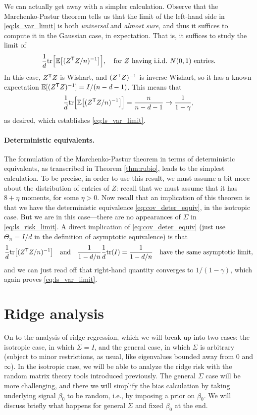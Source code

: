 \documentclass{article}
\begin{document}
We can actually get away with a simpler calculation. Observe that the
Marchenko-Pastur theorem tells us that the limit of the left-hand side in
\eqref{eq:ls_var_limit} is both \emph{universal} and \emph{almost sure}, and
thus it suffices to compute it in the Gaussian case, in expectation. That is, it 
suffices to study the limit of
\[
\frac{1}{d} \mathrm{tr} \Big[ \mathbb{E}\big[ (Z^{\mathsf{T}} Z/n)^{-1} \big] \Big], \quad \text{for $Z$ 
  having i.i.d.\ $N(0,1)$ entries.}
\]
In this case, $Z^{\mathsf{T}} Z$ is Wishart, and $(Z^{\mathsf{T}} Z)^{-1}$ is inverse Wishart, so it
has a known expectation $\mathbb{E}[(Z^{\mathsf{T}} Z)^{-1}] = I/(n-d-1)$. This means that
\[
\frac{1}{d} \mathrm{tr} \Big[ \mathbb{E}\big[ (Z^{\mathsf{T}} Z/n)^{-1} \big] \Big] = \frac{n}{n-d-1} \to
\frac{1}{1-\gamma}, 
\]
as desired, which establishes \eqref{eq:ls_var_limit}.

\paragraph{Deterministic equivalents.}

The formulation of the Marchenko-Pastur theorem in terms of deterministic
equivalents, as transcribed in Theorem \ref{thm:rubio}, leads to the simplest
calculation. To be precise, in order to use this result, we must assume a bit
more about the distribution of entries of $Z$: recall that we must assume that
it has $8+\eta$ moments, for some $\eta>0$. Now recall that an implication of
this theorem is that we have the deterministic equivalence
\eqref{eq:cov_deter_equiv}, in the isotropic case. But we are in this
case---there are no appearances of $\Sigma$ in \eqref{eq:ls_risk_limit}.  A 
direct implication of \eqref{eq:cov_deter_equiv} (just use $\Theta_n = I/d$ in
the definition of asymptotic equivalence) is that   
\[
\frac{1}{d} \mathrm{tr} \big[ (Z^{\mathsf{T}} Z/n)^{-1} \big] \quad \text{and} \quad
\frac{1}{1-d/n} \frac{1}{d} \mathrm{tr}(I) = \frac{1}{1-d/n} \quad \text{have the same 
  asymptotic limit}, 
\]
and we can just read off that right-hand quantity converges to $1/(1-\gamma)$,
which again proves \eqref{eq:ls_var_limit}.   

\section{Ridge analysis}

On to the analysis of ridge regression, which we will break up into two cases:
the isotropic case, in which $\Sigma = I$, and the general case, in which
$\Sigma$ is arbitrary (subject to minor restrictions, as usual, like eigenvalues
bounded away from $0$ and $\infty$). In the isotropic case, we will be able to
analyze the ridge risk with the random matrix theory tools introduced
previously.  The general $\Sigma $ case will be more challenging, and there we 
will simplify the bias calculation by taking underlying signal $\beta_0$ to be
random, i.e., by imposing a prior on $\beta_0$. We will discuss briefly what
happens for general $\Sigma$ and fixed $\beta_0$ at the end.          
\end{document}
